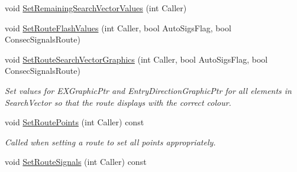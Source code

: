 \begin{DoxyCompactItemize}
\item 
void \mbox{\hyperlink{class_t_one_route_a8f8fe8f852dd24cf8d12933f22b5750c}{Set\+Remaining\+Search\+Vector\+Values}} (int Caller)
\item 
void \mbox{\hyperlink{class_t_one_route_abdb89bb3f7ce55d926bee3c2d4b3652f}{Set\+Route\+Flash\+Values}} (int Caller, bool Auto\+Sigs\+Flag, bool Consec\+Signals\+Route)
\item 
\mbox{\label{class_t_one_route_ae06f7e9335f1a94ff996ad634dc102a0}} 
void \mbox{\hyperlink{class_t_one_route_ae06f7e9335f1a94ff996ad634dc102a0}{Set\+Route\+Search\+Vector\+Graphics}} (int Caller, bool Auto\+Sigs\+Flag, bool Consec\+Signals\+Route)
\begin{DoxyCompactList}\small\item\em Set values for E\+X\+Graphic\+Ptr and Entry\+Direction\+Graphic\+Ptr for all elements in Search\+Vector so that the route displays with the correct colour. \end{DoxyCompactList}\item 
\mbox{\label{class_t_one_route_afc6dafc4713c2b10c9e21b28fac20430}} 
void \mbox{\hyperlink{class_t_one_route_afc6dafc4713c2b10c9e21b28fac20430}{Set\+Route\+Points}} (int Caller) const
\begin{DoxyCompactList}\small\item\em Called when setting a route to set all points appropriately. \end{DoxyCompactList}\item 
void \mbox{\hyperlink{class_t_one_route_a4dfe3a028da7a4b6df0f44f33c3e2196}{Set\+Route\+Signals}} (int Caller) const
\end{DoxyCompactItemize}
